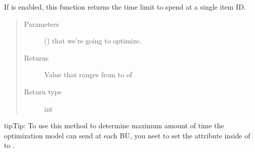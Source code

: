 \documentclass[letterpaper,10pt,english]{sphinxmanual}
\begin{document}
\begin{fulllineitems}
\begin{fulllineitems}
If  is enabled, this function returns
the time limit to spend at a single item ID.
\begin{quote}\begin{description}
\item[{Parameters}] \leavevmode
{} () \textendash{}  that we’re going to optimize.

\item[{Returns}] \leavevmode
Value that ranges from  to  of 

\item[{Return type}] \leavevmode
int

\end{description}\end{quote}

\begin{sphinxadmonition}{tip}{Tip:}
To use this method to determine maximum amount of time the optimization model can send at each BU, you neet to set         the attribute  inside of {\hyperref[\detokenize{source/optimization:module-optimization.constants}]{}} to .
\end{sphinxadmonition}

\end{fulllineitems}


\begin{fulllineitems}
\label{\detokenize{source/optimization.model:optimization.model.main.ModelOptimization.optimizable_inventory}}
\end{fulllineitems}



\end{fulllineitems}
\end{document}
